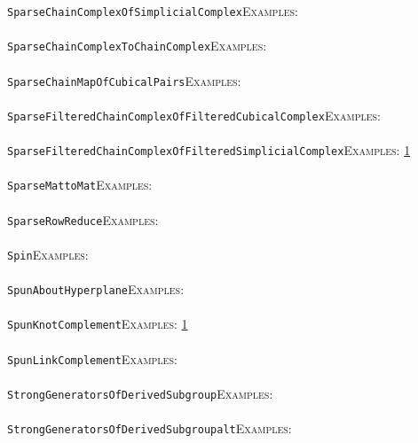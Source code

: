 \documentclass[a4paper,11pt]{report}
\begin{document}
{{ \texttt{SparseChainComplexOfSimplicialComplex}{\nobreakspace}{\nobreakspace}{\nobreakspace}{\nobreakspace}\textsc{Examples:} \\
 \\
 \texttt{SparseChainComplexToChainComplex}{\nobreakspace}{\nobreakspace}{\nobreakspace}{\nobreakspace}\textsc{Examples:} \\
 \\
 \texttt{SparseChainMapOfCubicalPairs}{\nobreakspace}{\nobreakspace}{\nobreakspace}{\nobreakspace}\textsc{Examples:} \\
 \\
 \texttt{SparseFilteredChainComplexOfFilteredCubicalComplex}{\nobreakspace}{\nobreakspace}{\nobreakspace}{\nobreakspace}\textsc{Examples:} \\
 \\
 \texttt{SparseFilteredChainComplexOfFilteredSimplicialComplex}{\nobreakspace}{\nobreakspace}{\nobreakspace}{\nobreakspace}\textsc{Examples:} \href{../www/SideLinks/About/aboutPersistent.html} {1}{\nobreakspace} \\
 \\
 \texttt{SparseMattoMat}{\nobreakspace}{\nobreakspace}{\nobreakspace}{\nobreakspace}\textsc{Examples:} \\
 \\
 \texttt{SparseRowReduce}{\nobreakspace}{\nobreakspace}{\nobreakspace}{\nobreakspace}\textsc{Examples:} \\
 \\
 \texttt{Spin}{\nobreakspace}{\nobreakspace}{\nobreakspace}{\nobreakspace}\textsc{Examples:} \\
 \\
 \texttt{SpunAboutHyperplane}{\nobreakspace}{\nobreakspace}{\nobreakspace}{\nobreakspace}\textsc{Examples:} \\
 \\
 \texttt{SpunKnotComplement}{\nobreakspace}{\nobreakspace}{\nobreakspace}{\nobreakspace}\textsc{Examples:} \href{../www/SideLinks/About/aboutCoverinSpaces.html} {1}{\nobreakspace} \\
 \\
 \texttt{SpunLinkComplement}{\nobreakspace}{\nobreakspace}{\nobreakspace}{\nobreakspace}\textsc{Examples:} \\
 \\
 \texttt{StrongGeneratorsOfDerivedSubgroup}{\nobreakspace}{\nobreakspace}{\nobreakspace}{\nobreakspace}\textsc{Examples:} \\
 \\
 \texttt{StrongGeneratorsOfDerivedSubgroup{\textunderscore}alt}{\nobreakspace}{\nobreakspace}{\nobreakspace}{\nobreakspace}\textsc{Examples:} \\
}}
\end{document}
